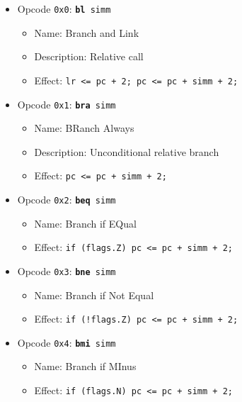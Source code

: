 \documentclass{article}
\begin{document}
	\singlespacing
	\begin{itemize}
	\item Opcode \texttt{0x0}:
		\texttt{\textbf{bl} simm}
		\begin{itemize}
		\item Name: Branch and Link
		\item Description: Relative call
		\item Effect:
			\texttt{lr <= pc + 2; pc <= pc + simm + 2;}
		\end{itemize}

	\item Opcode \texttt{0x1}:
		\texttt{\textbf{bra} simm}
		\begin{itemize}
		\item Name: BRanch Always
		\item Description: Unconditional relative branch
		\item Effect:
			\texttt{pc <= pc + simm + 2;}
		\end{itemize}

	\item Opcode \texttt{0x2}:
		\texttt{\textbf{beq} simm}
		\begin{itemize}
		\item Name: Branch if EQual
		\item Effect:
			\texttt{if (flags.Z) pc <= pc + simm + 2;}
		\end{itemize}

	\item Opcode \texttt{0x3}:
		\texttt{\textbf{bne} simm}
		\begin{itemize}
		\item Name: Branch if Not Equal
		\item Effect:
			\texttt{if (!flags.Z) pc <= pc + simm + 2;}
		\end{itemize}

	\item Opcode \texttt{0x4}:
		\texttt{\textbf{bmi} simm}
		\begin{itemize}
		\item Name: Branch if MInus
		\item Effect:
			\texttt{if (flags.N) pc <= pc + simm + 2;}
		\end{itemize}


\end{itemize}
\end{document}
